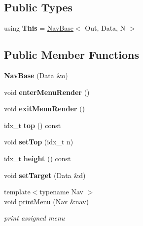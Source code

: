 \subsection*{Public Types}
\begin{DoxyCompactItemize}
\item 
\mbox{\label{classNavBase_a27cf431707047e81070935913b681ad5}} 
using {\bfseries This} = \hyperlink{classNavBase}{Nav\+Base}$<$ Out, Data, N $>$
\end{DoxyCompactItemize}
\subsection*{Public Member Functions}
\begin{DoxyCompactItemize}
\item 
\mbox{\label{classNavBase_a1132b13df31a45d5063f6885ff744a8d}} 
{\bfseries Nav\+Base} (Data \&o)
\item 
\mbox{\label{classNavBase_aff80f3745f21963614f4b39cb5cddbfb}} 
void {\bfseries enter\+Menu\+Render} ()
\item 
\mbox{\label{classNavBase_ad61f33f38293e66e9a6dc5d3f885ff9b}} 
void {\bfseries exit\+Menu\+Render} ()
\item 
\mbox{\label{classNavBase_a62d8e856e7a4a3c7847c423c72f04b90}} 
idx\+\_\+t {\bfseries top} () const
\item 
\mbox{\label{classNavBase_ae97b2cc72048f8476003fc8fc20bf7cc}} 
void {\bfseries set\+Top} (idx\+\_\+t n)
\item 
\mbox{\label{classNavBase_ac73c8b41f88ecdc61c08aab68ecdb0ec}} 
idx\+\_\+t {\bfseries height} () const
\item 
\mbox{\label{classNavBase_a1da54d7ac040ae97c8990087f449208a}} 
void {\bfseries set\+Target} (Data \&d)
\item 
{\footnotesize template$<$typename Nav $>$ }\\void \hyperlink{classNavBase_aa6815bc1e6e2e4a03758e175e4582d46}{print\+Menu} (Nav \&nav)
\begin{DoxyCompactList}\small\item\em print assigned menu \end{DoxyCompactList}\item 

\end{DoxyCompactItemize}

